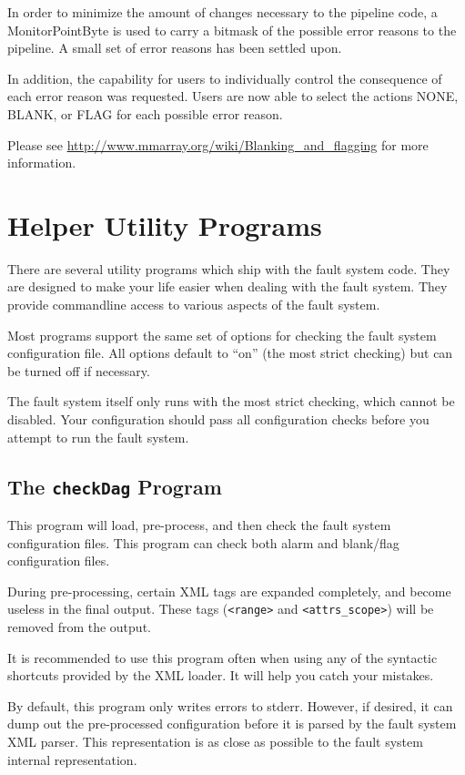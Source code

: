 \documentclass[letterpaper,12pt,oneside,pdftex]{article}
\begin{document}
In order to minimize the amount of changes necessary to the pipeline code, a
MonitorPointByte is used to carry a bitmask of the possible error reasons to the
pipeline. A small set of error reasons has been settled upon.

In addition, the capability for users to individually control the consequence of
each error reason was requested. Users are now able to select the actions NONE,
BLANK, or FLAG for each possible error reason.

Please see \url{http://www.mmarray.org/wiki/Blanking_and_flagging}
for more information.

\section{Helper Utility Programs}

There are several utility programs which ship with the fault system code. They
are designed to make your life easier when dealing with the fault system. They
provide commandline access to various aspects of the fault system.

Most programs support the same set of options for checking the fault system
configuration file. All options default to ``on'' (the most strict checking) but
can be turned off if necessary.

The fault system itself only runs with the most strict checking, which cannot be
disabled. Your configuration should pass all configuration checks before you
attempt to run the fault system.

\subsection{The \texttt{checkDag} Program}

This program will load, pre-process, and then check the fault system
configuration files. This program can check both alarm and blank/flag
configuration files.

During pre-processing, certain XML tags are expanded completely, and become
useless in the final output. These tags (\verb|<range>| and
\verb|<attrs_scope>|) will be removed from the output.

It is recommended to use this program often when using any of the syntactic
shortcuts provided by the XML loader. It will help you catch your mistakes.

By default, this program only writes errors to stderr. However, if desired, it
can dump out the pre-processed configuration before it is parsed by the fault
system XML parser. This representation is as close as possible to the fault
system internal representation.
\end{document}

